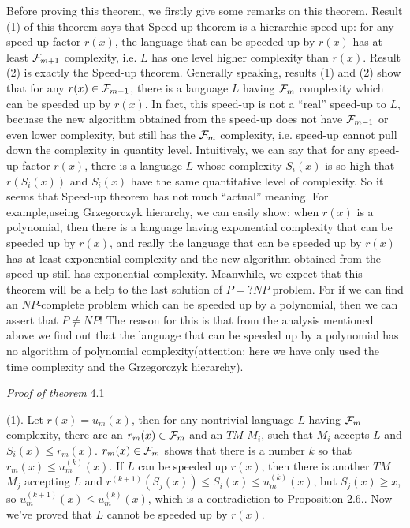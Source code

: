 Before proving this theorem, we firstly give some remarks on this 
theorem. Result (1) of this theorem says that Speed-up theorem is 
a hierarchic speed-up: for any speed-up factor $r(x)$, the language
that can be speeded up by $r(x)$ has at least ${\cal F}_{m+1}$ 
complexity, i.e. $L$ has one level higher complexity than $r(x)$.
Result (2) is exactly the Speed-up theorem. Generally speaking, 
results (1) and (2) show that for any $r(x)\in{\cal F}_{m-1}$,
there is a language $L$ having ${\cal F}_m$ complexity which can be
speeded up by $r(x)$. In fact, this speed-up is not a
``real'' speed-up to $L$, becuase the new algorithm obtained from
the speed-up does not have ${\cal F}_{m-1}$ or even lower complexity, but still 
has the ${\cal F}_m$
complexity, i.e. speed-up cannot pull down the complexity in
quantity level. Intuitively, we can say that for any speed-up 
factor $r(x)$, there is a language $L$ whose complexity $S_i(x)$ 
is so high that $r(S_i(x))$ and $S_i(x)$ have the same 
quantitative level of complexity. So it seems that Speed-up 
theorem has not much ``actual'' meaning. For example,useing Grzegorczyk
hierarchy, we can easily show: when $r(x)$ is a polynomial, then
there is a language having exponential complexity that can be speeded
up by $r(x)$, and really the language that can be speeded up
by $r(x)$ has at least exponential complexity and the new
algorithm obtained from the speed-up still
has exponential complexity. Meanwhile, we expect that this 
theorem will be a help to the last solution of $P=?NP$ problem. For
if we can find an $NP$-complete problem which can be speeded up
by a polynomial, then we can assert that $P\ne NP$! The reason
for this is that from the analysis mentioned above we find out that
the language that can be speeded up by a polynomial has no 
algorithm of polynomial complexity(attention: here we have only used
the time complexity and the Grzegorczyk hierarchy).

{\it Proof of theorem} 4.1


(1). Let $r(x)=u_m(x)$, then for any nontrivial language $L$ having
${\cal F}_m$ complexity, there are an $r_m(x)\in{\cal F}_m$ and
an $TM$ $M_i$, such that $M_i$ accepts $L$ and $S_i(x)\le 
r_m(x)$. $r_m(x)\in{\cal F}_m$ shows that there is a number $k$ so 
that $r_m(x)\le u^{(k)}_m(x)$. If $L$ can be speeded up $r(x)$, 
then there is another $TM$ $M_j$ accepting $L$ and 
$r^{(k+1)}(S_j(x))\le S_i(x)\le u^{(k)}_m(x)$, but $S_j(x)\ge x$, 
so $u^{(k+1)}_m(x)\le u^{(k)}_m(x)$, which is a contradiction to 
Proposition 2.6.. Now we've proved that $L$ cannot be speeded up
by $r(x)$.

